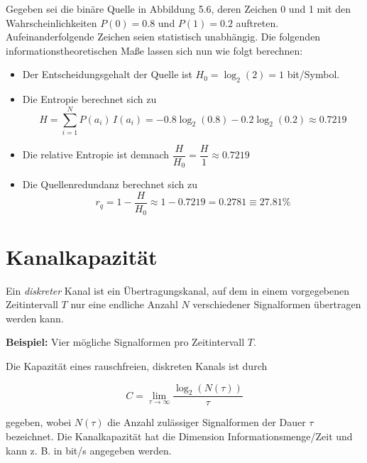 \begin{beispiel}
Gegeben sei die binäre Quelle in Abbildung 5.6, deren Zeichen 0 und 1 mit den Wahrscheinlichkeiten $P(0) = 0.8$ und $P(1) = 0.2$ auftreten. Aufeinanderfolgende Zeichen seien statistisch unabhängig. Die folgenden informationstheoretischen Maße lassen sich nun wie folgt berechnen:

\begin{itemize}
  \item Der Entscheidungsgehalt der Quelle ist $H_0 = \log_2(2) = 1$ bit/Symbol.

  \item Die Entropie berechnet sich zu
$$
H = \sum_{i=1}^{N} P(a_i)\,I(a_i) = -0.8\log_2(0.8) - 0.2\log_2(0.2) \approx 0.7219
$$

  \item Die relative Entropie ist demnach $\dfrac{H}{H_0} = \dfrac{H}{1} \approx 0.7219$

  \item Die Quellenredundanz berechnet sich zu
$$
r_q = 1 - \frac{H}{H_0} \approx 1 - 0.7219 = 0.2781 \equiv 27.81\%
$$
\end{itemize}

\end{beispiel}

\section{Kanalkapazität}
\label{sec:kanalkapazitaet}

Ein \textit{diskreter} Kanal ist ein Übertragungskanal, auf dem in einem vorgegebenen Zeitintervall $T$ nur eine endliche Anzahl $N$ verschiedener Signalformen übertragen werden kann.

\textbf{Beispiel:} Vier mögliche Signalformen pro Zeitintervall $T$.


\begin{definition}[Kanalkapazität]
Die Kapazität eines rauschfreien, diskreten Kanals ist durch

$$
C = \lim_{\tau \to \infty} \frac{\log_2(N(\tau))}{\tau}
$$

gegeben, wobei $N(\tau)$ die Anzahl zulässiger Signalformen der Dauer $\tau$ bezeichnet. Die Kanalkapazität hat die Dimension Informationsmenge/Zeit und kann z. B. in bit/s angegeben werden.
\end{definition}


